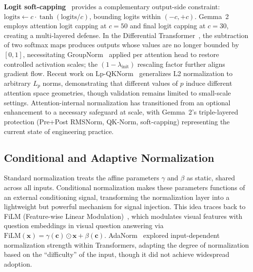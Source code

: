 \textbf{Logit soft-capping}~\cite{gemma2024improving} provides a complementary output-side constraint: $\text{logits} \leftarrow c \cdot \tanh(\text{logits} / c)$, bounding logits within $(-c, +c)$.
Gemma~2 employs attention logit capping at $c = 50$ and final logit capping at $c = 30$, creating a multi-layered defense.
In the Differential Transformer~\cite{ye2024differential}, the subtraction of two softmax maps produces outputs whose values are no longer bounded by $[0, 1]$, necessitating GroupNorm~\cite{wu2018group} applied per attention head to restore controlled activation scales; the $(1 - \lambda_{\text{init}})$ rescaling factor further aligns gradient flow.
Recent work on Lp-QKNorm~\cite{lopez2026enhanced} generalizes L2 normalization to arbitrary $L_p$ norms, demonstrating that different values of $p$ induce different attention space geometries, though validation remains limited to small-scale settings.
Attention-internal normalization has transitioned from an optional enhancement to a necessary safeguard at scale, with Gemma~2's triple-layered protection (Pre+Post RMSNorm, QK-Norm, soft-capping) representing the current state of engineering practice.

\subsection{Conditional and Adaptive Normalization}

Standard normalization treats the affine parameters $\gamma$ and $\beta$ as static, shared across all inputs.
Conditional normalization makes these parameters functions of an external conditioning signal, transforming the normalization layer into a lightweight but powerful mechanism for signal injection.
This idea traces back to FiLM (Feature-wise Linear Modulation)~\cite{perez2018film}, which modulates visual features with question embeddings in visual question answering via $\text{FiLM}(\mathbf{x}) = \gamma(\mathbf{c}) \odot \mathbf{x} + \beta(\mathbf{c})$.
AdaNorm~\cite{xu2019understanding} explored input-dependent normalization strength within Transformers, adapting the degree of normalization based on the ``difficulty'' of the input, though it did not achieve widespread adoption.

